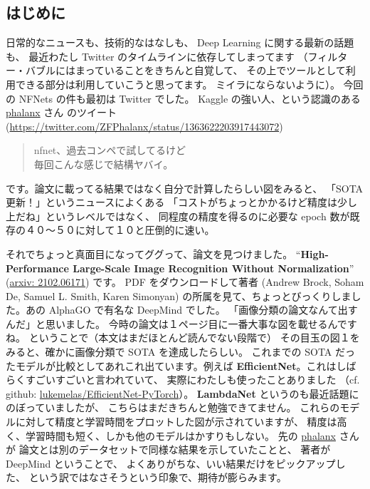 \documentclass[dvipdfmx,autodetect-engine,10pt,b5paper,papersize,openany,dvipsnames]{jsbook}
\begin{document}
\begin{multicols}{2}

\section{はじめに}
日常的なニュースも、技術的なはなしも、 Deep Learning に関する最新の話題も、
最近わたし Twitter のタイムラインに依存してしまってます
（フィルター・バブルにはまっていることをきちんと自覚して、
その上でツールとして利用できる部分は利用していこうと思ってます。
ミイラにならないように）。
今回の NFNets の件も最初は Twitter でした。
Kaggle の強い人、という認識のある \href{https://twitter.com/ZFPhalanx}{phalanx} さん
のツイート (\url{https://twitter.com/ZFPhalanx/status/1363622203917443072})
\begin{quotation}
  \noindent
  nfnet、過去コンペで試してるけど\\
  毎回こんな感じで結構ヤバイ。
\end{quotation}
です。論文に載ってる結果ではなく自分で計算したらしい図をみると、
「SOTA 更新！」というニュースによくある
「コストがちょっとかかるけど精度は少し上だね」というレベルではなく、
同程度の精度を得るのに必要な epoch 数が既存の４０〜５０に対して１０と圧倒的に速い。

それでちょっと真面目になってググって、論文を見つけました。
``\textbf{High-Performance Large-Scale Image Recognition Without Normalization}''
(\href{https://arxiv.org/abs/2102.06171}{arxiv: 2102.06171})
です。
PDF をダウンロードして著者
(Andrew Brock, Soham De, Samuel L. Smith, Karen Simonyan)
の所属を見て、ちょっとびっくりしました。あの AlphaGO で有名な DeepMind でした。
「画像分類の論文なんて出すんだ」と思いました。
今時の論文は１ページ目に一番大事な図を載せるんですね。
ということで（本文はまだほとんど読んでない段階で）
その目玉の図１をみると、確かに画像分類で SOTA を達成したらしい。
これまでの SOTA だったモデルが比較としてあれこれ出ています。例えば
{\bfseries EfficientNet}。これはしばらくすごいすごいと言われていて、
実際にわたしも使ったことありました
（cf. github: \href{https://github.com/lukemelas/EfficientNet-PyTorch}{lukemelas/EfficientNet-PyTorch}）。
{\bfseries LambdaNet} というのも最近話題にのぼっていましたが、
こちらはまだきちんと勉強できてません。
これらのモデルに対して精度と学習時間をプロットした図が示されていますが、
精度は高く、学習時間も短く、しかも他のモデルはかすりもしない。
先の \href{https://twitter.com/ZFPhalanx}{phalanx} さんが
論文とは別のデータセットで同様な結果を示していたことと、
著者が DeepMind ということで、
よくありがちな、いい結果だけをピックアップした、
という訳ではなさそうという印象で、期待が膨らみます。



\end{multicols}
\end{document}
